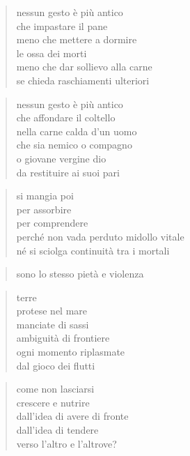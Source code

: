 

	\begin{verse}
		nessun gesto è più antico\\
		che impastare il pane\\
		meno che mettere a dormire\\
		le ossa dei morti\\
		meno che dar sollievo alla carne\\
		se chieda raschiamenti ulteriori
	\end{verse}

	\begin{verse}
		nessun gesto è più antico\\
		che affondare il coltello\\
		nella carne calda d’un uomo\\
		che sia nemico o compagno\\
		o giovane vergine dio\\
		da restituire ai suoi pari
	\end{verse}

	\begin{verse}
		si mangia poi\\
		per assorbire\\
		per comprendere\\
		perché non vada perduto midollo vitale\\
		né si sciolga continuità tra i mortali
	\end{verse}

	\begin{verse}
		sono lo stesso pietà e violenza
	\end{verse}

\clearpage



	\begin{verse}
		terre\\
		protese nel mare\\
		manciate di sassi\\
		ambiguità di frontiere\\
		ogni momento riplasmate\\
		dal gioco dei flutti
	\end{verse}

	\begin{verse}
		come non lasciarsi\\
		crescere e nutrire\\
		dall’idea di avere di fronte\\
		dall’idea di tendere\\
		verso l’altro e l’altrove?
	\end{verse}

